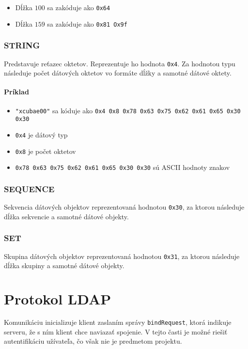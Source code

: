 \documentclass[12pt]{report}
\begin{document}
\begin{itemize}
    \item Dĺžka $100$ sa zakóduje ako \texttt{0x64}
    \item Dĺžka $159$ sa zakóduje ako \texttt{0x81 Ox9f}
\end{itemize}

\subsection{STRING}

Predstavuje reťazec oktetov. Reprezentuje ho hodnota \texttt{0x4}. Za hodnotou typu následuje počet
dátových oktetov vo formáte dĺžky a samotné dátové oktety.

\subsubsection*{Príklad}

\begin{itemize}
    \item \texttt{"xcubae00"} sa kóduje ako \texttt{0x4 0x8 0x78 0x63 0x75 0x62 0x61 0x65 0x30 0x30}
    \item \texttt{0x4} je dátový typ
    \item \texttt{0x8} je počet oktetov
    \item \texttt{0x78 0x63 0x75 0x62 0x61 0x65 0x30 0x30} sú ASCII hodnoty znakov
\end{itemize}

\subsection{SEQUENCE}

Sekvencia dátových objektov reprezentovaná hodnotou \texttt{0x30}, za ktorou následuje
dĺžka sekvencie a samotné dátové objekty.

\subsection{SET}

Skupina dátových objektov reprezentovaná hodnotou \texttt{0x31}, za ktorou následuje
dĺžka skupiny a samotné dátové objekty.

\chapter{Protokol LDAP}

Komunikáciu inicializuje klient zaslaním správy \texttt{bindRequest}, ktorá indikuje serveru,
že s ním klient chce naviazať spojenie.
V tejto časti je možné riešiť autentifikáciu užívateľa, čo však nie je predmetom projektu.
\end{document}

